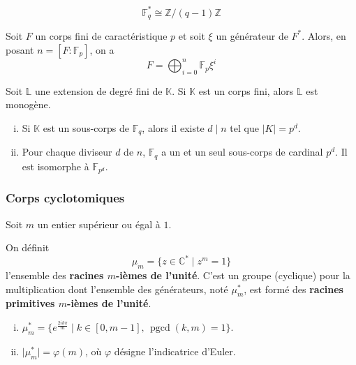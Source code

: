 	\begin{corollary}
		\[ \mathbb{F}_q^* \cong \mathbb{Z}/(q-1)\mathbb{Z} \]
	\end{corollary}
	
	\begin{proposition}
		Soit $F$ un corps fini de caractéristique $p$ et soit $\xi$ un générateur de $F^*$. Alors, en posant $n = [F:\mathbb{F}_p]$, on a
		\[ F = \bigoplus_{i=0}^n \mathbb{F}_p \xi^i \]
	\end{proposition}
	
	\begin{theorem}
		Soit $\mathbb{L}$ une extension de degré fini de $\mathbb{K}$. Si $\mathbb{K}$ est un corps fini, alors $\mathbb{L}$ est monogène.
	\end{theorem}
	
	
	\begin{theorem}
		\begin{enumerate}[(i)]
			\item Si $\mathbb{K}$ est un sous-corps de $\mathbb{F}_q$, alors il existe $d \mid n$ tel que $\vert K \vert = p^d$.
			\item Pour chaque diviseur $d$ de $n$, $\mathbb{F}_q$ a un et un seul sous-corps de cardinal $p^d$. Il est isomorphe à $\mathbb{F}_{p^d}$.
		\end{enumerate}
	\end{theorem}
	
	\subsubsection{Corps cyclotomiques}
	
	Soit $m$ un entier supérieur ou égal à $1$.
	
	
	\begin{definition}
		On définit
		\[ \mu_m = \{ z \in \mathbb{C}^* \mid z^m = 1 \} \]
		l'ensemble des \textbf{racines $m$-ièmes de l'unité}. C'est un groupe (cyclique) pour la multiplication dont l'ensemble des générateurs, noté $\mu_m^*$, est formé des \textbf{racines primitives $m$-ièmes de l'unité}.
	\end{definition}
	
	\begin{proposition}
		\begin{enumerate}[(i)]
			\item $\mu_m^* = \{ e^{\frac{2ik\pi}{m}} \mid k \in [0, m-1], \, \operatorname{pgcd}(k, m) = 1 \}$.
			\item $\vert \mu_m^* \vert = \varphi(m)$, où $\varphi$ désigne l'indicatrice d'Euler.
		\end{enumerate}
	\end{proposition}
	
